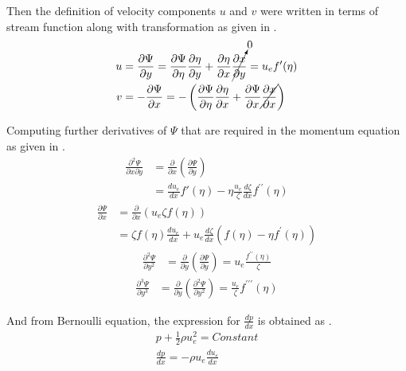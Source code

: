 \par Then the definition of velocity components $u$ and $v$ were written in
terms of stream function along with transformation as given in .
\begin{align}
    u &= \frac{\partial \Psi}{\partial y} = \frac{\partial \Psi}{\partial \eta} \frac{\partial \eta}{\partial y} + \frac{\partial \eta}{\partial x}\cancelto{0}{ \frac{\partial x}{\partial y}} = u_e f'(\eta) \label{u_transformation} \\
    v &= - \frac{\partial \Psi}{\partial x} = -\left(\frac{\partial \Psi}{\partial \eta}\frac{\partial \eta}{\partial x} + \frac{\partial \Psi}{\partial x}\cancel{\frac{\partial x}{\partial x}}\right) \label{v_transformation}
\end{align}

\par Computing further derivatives of $\Psi$ that are required in the momentum
equation as given in .
\begin{align}
    \frac{\partial^2 \Psi}{\partial x \partial y} &= \frac{\partial }{\partial x} \left(\frac{\partial \Psi}{\partial y}\right) \nonumber \\
    &= \frac{d u_e}{dx} f'(\eta) - \eta \frac{u_e}{\zeta} \frac{d \zeta}{dx} f^{\prime\prime}(\eta) \label{dshi_dxdy}
\end{align}
\begin{align}
    \frac{\partial \Psi}{\partial x} &= \frac{\partial}{\partial x} \left(u_e \zeta f(\eta)\right) \nonumber \\
    &= \zeta f(\eta) \frac{d u_e}{dx} + u_e \frac{d\zeta}{dx} \left(f(\eta) - \eta f^\prime(\eta)\right) \label{dshi_dx}
\end{align}
\begin{align}
    \frac{\partial^2 \Psi}{\partial y^2} &= \frac{\partial}{\partial y} \left(\frac{\partial \Psi}{\partial y}\right) = u_e \frac{f^{\prime\prime}(\eta)}{\zeta} \label{d2shi_dy2}
\end{align}
\begin{align}
    \frac{\partial^3 \Psi}{\partial y^3} &= \frac{\partial}{\partial y}\left(\frac{\partial^2 \Psi}{\partial y^2}\right) = \frac{u_e}{\zeta} f^{\prime\prime\prime}(\eta) \label{d3shi_dy3}
\end{align}

\par And from Bernoulli equation, the expression for \(\frac{dp}{dx}\) is obtained
as .
\begin{align}
   p + \frac{1}{2}\rho u_e^2 = Constant \nonumber \\
    \frac{dp}{dx} = -\rho u_e \frac{d u_e}{dx} \label{dpdx}
\end{align}

